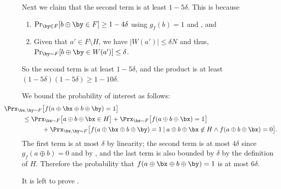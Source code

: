\documentclass[11pt]{article}
\theoremstyle{definition}
\begin{document}
\begin{proofof}{}
Next we claim that the second term is at least $1-5 \delta$.
This is because
\begin{flushleft}\begin{enumerate}
    \item 
 $\Pr_{\by \in F}[b \oplus \by \in F ] \geq 1-4 \delta$ using $g_f(b)=1$
 and , and 
\item Given that $a' \in F \setminus H$, we have  
  $|W(a')| \leq \delta N$ and thus,
 $\Pr_{\by \sim F}[b \oplus \by \in W(a')] \leq \delta$. 
\end{enumerate}\end{flushleft}
So the second term is at least $1-5 \delta$, and 
  the product is at least $(1-5\delta)(1-5\delta) \geq 1-10\delta$.
\medskip

We bound the probability of interest as follows:
\begin{align*}
    &\hspace{-1cm}\Prx_{\bx,\by \sim F}\big[f(a \oplus \bx \oplus b \oplus \by)=1\big] \\
    &\leq \Prx_{\bx \sim F}\big[a\oplus b \oplus \bx \in H\big] + \Prx_{\bx \sim F}\big[f(a \oplus b \oplus \bx)=1\big] \\
    & ~~~~~~~~~+\Prx_{\bx,\by \sim F}\big[f(a\oplus \bx \oplus b \oplus \by)=1 \hspace{0.08cm}|\hspace{0.08cm} a\oplus b \oplus \bx \not \in H \land f(a \oplus b \oplus \bx)=0\big].
\end{align*}
The first term is at most $\delta$ by linearity;
the second term is at most $4\delta$ since $g_f(a\oplus b)=0$ and by , and the last term is also bounded by $\delta$ by the definition of $H$. 
Therefore the probability that $f(a \oplus \bx \oplus b \oplus \by)=1$ is at most $6 \delta$. 
\end{proofof}
 



It is left to prove .
\end{document}
